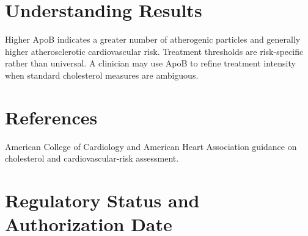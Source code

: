 \section*{Understanding Results}
Higher ApoB indicates a greater number of atherogenic particles and generally higher atherosclerotic cardiovascular risk. Treatment thresholds are risk-specific rather than universal. A clinician may use ApoB to refine treatment intensity when standard cholesterol measures are ambiguous.

\section*{References}
American College of Cardiology and American Heart Association guidance on cholesterol and cardiovascular-risk assessment.

\clearpage


\section*{Regulatory Status and Authorization Date}

\clearpage
